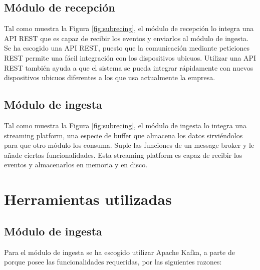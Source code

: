 \subsection{Módulo de recepción}
Tal como muestra la Figura \ref{fig:subrecing}, el módulo de recepción lo integra una API REST \cite{Tfg:REST} que es capaz de recibir los eventos y enviarlos al módulo de ingesta. Se ha escogido una API REST, puesto que la comunicación mediante peticiones REST permite una fácil integración con los dispositivos ubicuos. Utilizar una API REST también ayuda a que el sistema se pueda integrar rápidamente con nuevos dispositivos ubicuos diferentes a los que usa actualmente la empresa.

\subsection{Módulo de ingesta}
Tal como muestra la Figura \ref{fig:subrecing}, el módulo de ingesta lo integra una streaming platform, una especie de buffer que almacena los datos sirviéndolos para que otro módulo los consuma. Suple las funciones de un message broker\cite{Tfg:messagebroker} y le añade ciertas funcionalidades. Esta streaming platform es capaz de recibir los eventos y almacenarlos en memoria y en disco.


\section{Herramientas utilizadas}

\subsection{Módulo de ingesta}
Para el módulo de ingesta se ha escogido utilizar Apache Kafka\cite{Tfg:kafka}, a parte de porque posee las funcionalidades requeridas, por las siguientes razones:

